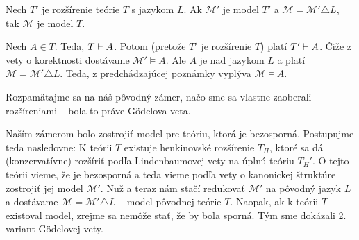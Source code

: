 \begin{veta}
    Nech $T'$ je rozšírenie teórie $T$ s jazykom $L$.
    Ak $\mathcal{M}'$ je model $T'$ a 
    $\mathcal{M} =\mathcal{M}'\triangle L$, tak $\mathcal{M}$ je model $T$.
\end{veta}
\begin{dokaz}
    Nech $A \in T$. Teda, $T \vdash A$. Potom (pretože $T'$ je
    rozšírenie $T$) platí $T' \vdash A$.
    Čiže z vety o korektnosti dostávame $\mathcal{M}' \models A$. Ale
    $A$ je nad jazykom $L$ a platí $\mathcal{M}= \mathcal{M'}
    \triangle L$. Teda, z predchádzajúcej poznámky vyplýva
    $\mathcal{M} \models A$.
    \\
\end{dokaz}

\noindent
Rozpamätajme sa na náš pôvodný zámer, načo sme sa vlastne zaoberali
rozšíreniami -- bola to práve G\"odelova veta.

\begin{dokaz}
    Naším zámerom bolo zostrojiť model pre teóriu, ktorá je bezosporná.
    Postupujme teda nasledovne: K teórii $T$ existuje henkinovské
    rozšírenie $T_H$, ktoré sa dá (konzervatívne) rozšíriť podľa
    Lindenbaumovej vety na úplnú teóriu $T_H'$. O tejto teórii vieme, že
    je bezosporná a teda vieme podľa vety o kanonickej štruktúre
    zostrojiť jej model $\mathcal{M}'$. Nuž a teraz nám stačí redukovať
    $\mathcal{M}'$ na pôvodný jazyk $L$ a dostávame
    $\mathcal{M}= \mathcal{M}' \triangle L$ -- model pôvodnej teórie $T$.
    Naopak, ak k teórii $T$ existoval model, zrejme sa nemôže stať, že by
    bola sporná. Tým sme dokázali 2. variant G\"odelovej vety.
    \\
\end{dokaz}
